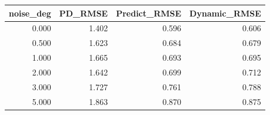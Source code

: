 \begin{tabular}{rrrr}
\toprule
noise_deg & PD_RMSE & Predict_RMSE & Dynamic_RMSE \\
\midrule
0.000 & 1.402 & 0.596 & 0.606 \\
0.500 & 1.623 & 0.684 & 0.679 \\
1.000 & 1.665 & 0.693 & 0.695 \\
2.000 & 1.642 & 0.699 & 0.712 \\
3.000 & 1.727 & 0.761 & 0.788 \\
5.000 & 1.863 & 0.870 & 0.875 \\
\bottomrule
\end{tabular}
